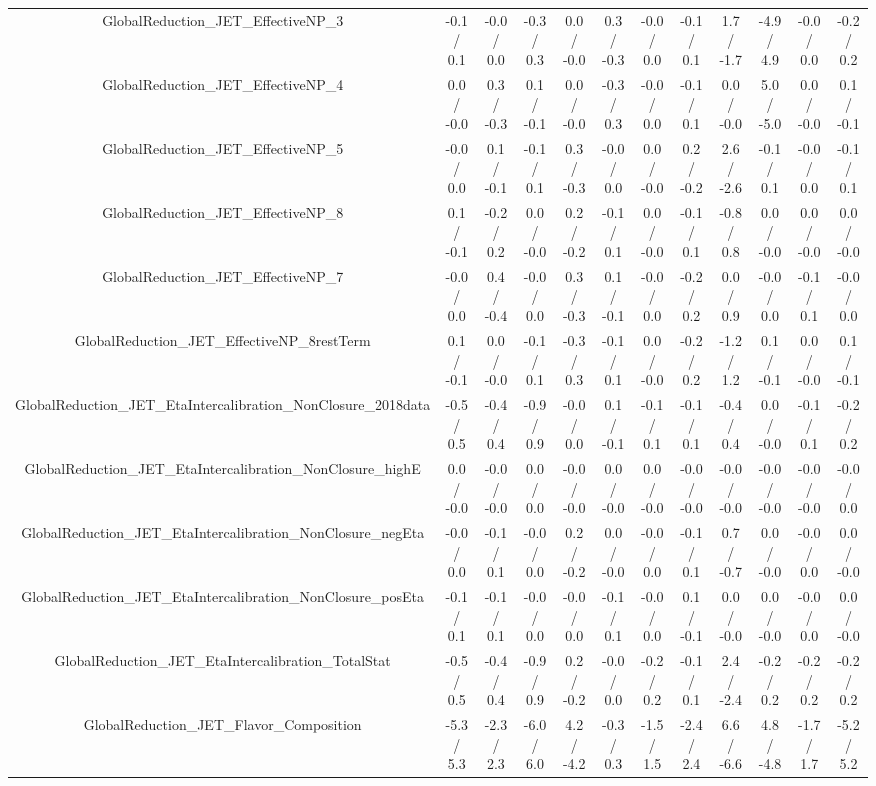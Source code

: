 \begin{table}[htbp]
\begin{center}
\begin{tabular}{|c|c|c|c|c|c|c|c|c|c|c|c|}
  GlobalReduction_JET_EffectiveNP_3 & -0.1 / 0.1 & -0.0 / 0.0 & -0.3 / 0.3 & 0.0 / -0.0 & 0.3 / -0.3 & -0.0 / 0.0 & -0.1 / 0.1 & 1.7 / -1.7 & -4.9 / 4.9 & -0.0 / 0.0 & -0.2 / 0.2 \\ 
  GlobalReduction_JET_EffectiveNP_4 & 0.0 / -0.0 & 0.3 / -0.3 & 0.1 / -0.1 & 0.0 / -0.0 & -0.3 / 0.3 & -0.0 / 0.0 & -0.1 / 0.1 & 0.0 / -0.0 & 5.0 / -5.0 & 0.0 / -0.0 & 0.1 / -0.1 \\ 
  GlobalReduction_JET_EffectiveNP_5 & -0.0 / 0.0 & 0.1 / -0.1 & -0.1 / 0.1 & 0.3 / -0.3 & -0.0 / 0.0 & 0.0 / -0.0 & 0.2 / -0.2 & 2.6 / -2.6 & -0.1 / 0.1 & -0.0 / 0.0 & -0.1 / 0.1 \\ 
  GlobalReduction_JET_EffectiveNP_8 & 0.1 / -0.1 & -0.2 / 0.2 & 0.0 / -0.0 & 0.2 / -0.2 & -0.1 / 0.1 & 0.0 / -0.0 & -0.1 / 0.1 & -0.8 / 0.8 & 0.0 / -0.0 & 0.0 / -0.0 & 0.0 / -0.0 \\ 
  GlobalReduction_JET_EffectiveNP_7 & -0.0 / 0.0 & 0.4 / -0.4 & -0.0 / 0.0 & 0.3 / -0.3 & 0.1 / -0.1 & -0.0 / 0.0 & -0.2 / 0.2 & 0.0 / 0.9 & -0.0 / 0.0 & -0.1 / 0.1 & -0.0 / 0.0 \\ 
  GlobalReduction_JET_EffectiveNP_8restTerm & 0.1 / -0.1 & 0.0 / -0.0 & -0.1 / 0.1 & -0.3 / 0.3 & -0.1 / 0.1 & 0.0 / -0.0 & -0.2 / 0.2 & -1.2 / 1.2 & 0.1 / -0.1 & 0.0 / -0.0 & 0.1 / -0.1 \\ 
  GlobalReduction_JET_EtaIntercalibration_NonClosure_2018data & -0.5 / 0.5 & -0.4 / 0.4 & -0.9 / 0.9 & -0.0 / 0.0 & 0.1 / -0.1 & -0.1 / 0.1 & -0.1 / 0.1 & -0.4 / 0.4 & 0.0 / -0.0 & -0.1 / 0.1 & -0.2 / 0.2 \\ 
  GlobalReduction_JET_EtaIntercalibration_NonClosure_highE & 0.0 / -0.0 & -0.0 / -0.0 & 0.0 / 0.0 & -0.0 / -0.0 & 0.0 / -0.0 & 0.0 / -0.0 & -0.0 / -0.0 & -0.0 / -0.0 & -0.0 / -0.0 & -0.0 / -0.0 & -0.0 / 0.0 \\ 
  GlobalReduction_JET_EtaIntercalibration_NonClosure_negEta & -0.0 / 0.0 & -0.1 / 0.1 & -0.0 / 0.0 & 0.2 / -0.2 & 0.0 / -0.0 & -0.0 / 0.0 & -0.1 / 0.1 & 0.7 / -0.7 & 0.0 / -0.0 & -0.0 / 0.0 & 0.0 / -0.0 \\ 
  GlobalReduction_JET_EtaIntercalibration_NonClosure_posEta & -0.1 / 0.1 & -0.1 / 0.1 & -0.0 / 0.0 & -0.0 / 0.0 & -0.1 / 0.1 & -0.0 / 0.0 & 0.1 / -0.1 & 0.0 / -0.0 & 0.0 / -0.0 & -0.0 / 0.0 & 0.0 / -0.0 \\ 
  GlobalReduction_JET_EtaIntercalibration_TotalStat & -0.5 / 0.5 & -0.4 / 0.4 & -0.9 / 0.9 & 0.2 / -0.2 & -0.0 / 0.0 & -0.2 / 0.2 & -0.1 / 0.1 & 2.4 / -2.4 & -0.2 / 0.2 & -0.2 / 0.2 & -0.2 / 0.2 \\ 
  GlobalReduction_JET_Flavor_Composition & -5.3 / 5.3 & -2.3 / 2.3 & -6.0 / 6.0 & 4.2 / -4.2 & -0.3 / 0.3 & -1.5 / 1.5 & -2.4 / 2.4 & 6.6 / -6.6 & 4.8 / -4.8 & -1.7 / 1.7 & -5.2 / 5.2 \\ 

\end{tabular}
\end{center}
\end{table}
